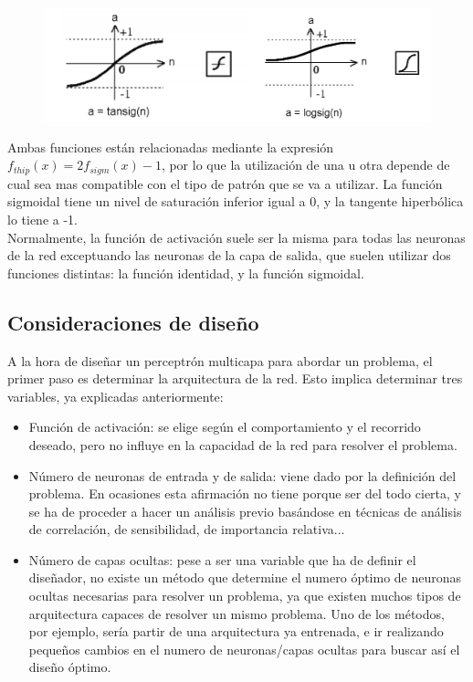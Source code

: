 \begin{figure}[htp]
\centering
\vspace{-1.5em}
\includegraphics[scale=0.6]{images/tansig_vs_logsig.png}
\end{figure}
Ambas funciones están relacionadas mediante la expresión ${f_{thip}(x)=2f_{sigm}(x)-1}$, por lo que la utilización de una u otra depende de cual sea mas compatible con el tipo de patrón que se va a utilizar. La función sigmoidal tiene un nivel de saturación inferior igual a 0, y la tangente hiperbólica lo tiene a -1.\\
Normalmente, la función de activación suele ser la misma para todas las neuronas de la red exceptuando las neuronas de la capa de salida, que suelen utilizar dos funciones distintas: la función identidad, y la función sigmoidal.
\subsection{Consideraciones de diseño}
A la hora de diseñar un perceptrón multicapa para abordar un problema, el primer paso es determinar la arquitectura de la red. Esto implica determinar tres variables, ya explicadas anteriormente:
\begin{itemize}
\item Función de activación: se elige según el comportamiento y el recorrido deseado, pero no influye en la capacidad de la red para resolver el problema.
\item Número de neuronas de entrada y de salida: viene dado por la definición del problema. En ocasiones esta afirmación no tiene porque ser del todo cierta, y se ha de proceder a hacer un análisis previo basándose en técnicas de análisis de correlación, de sensibilidad, de importancia relativa...
\item Número de capas ocultas: pese a ser una variable que ha de definir el diseñador, no existe un método que determine el numero óptimo de neuronas ocultas necesarias para resolver un problema, ya que existen muchos tipos de arquitectura capaces de resolver un mismo problema. Uno de los métodos, por ejemplo, sería partir de una arquitectura ya entrenada, e ir realizando pequeños cambios en el numero de neuronas/capas ocultas para buscar así el diseño óptimo.
\end{itemize}
